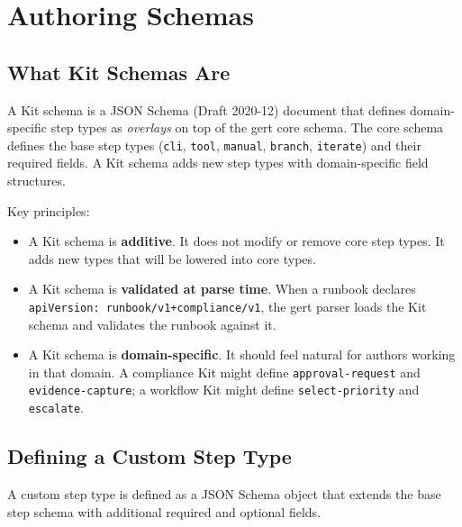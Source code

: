 
\chapter{Authoring Schemas}
\label{ch:authoring-schemas}

\section{What Kit Schemas Are}
\label{sec:what-schemas-are}

A Kit schema is a JSON Schema (Draft 2020-12) document that defines
domain-specific step types as \emph{overlays} on top of the gert core schema.
The core schema defines the base step types (\texttt{cli}, \texttt{tool},
\texttt{manual}, \texttt{branch}, \texttt{iterate}) and their required fields.
A Kit schema adds new step types with domain-specific field structures.

Key principles:

\begin{itemize}
  \item A Kit schema is \textbf{additive}. It does not modify or remove core
    step types. It adds new types that will be lowered into core types.
  \item A Kit schema is \textbf{validated at parse time}. When a runbook
    declares \texttt{apiVersion: runbook/v1+compliance/v1}, the gert parser
    loads the Kit schema and validates the runbook against it.
  \item A Kit schema is \textbf{domain-specific}. It should feel natural for
    authors working in that domain. A compliance Kit might define
    \texttt{approval-request} and \texttt{evidence-capture}; a workflow Kit
    might define \texttt{select-priority} and \texttt{escalate}.
\end{itemize}

\section{Defining a Custom Step Type}
\label{sec:custom-step-type}

A custom step type is defined as a JSON Schema object that extends the base
step schema with additional required and optional fields.

